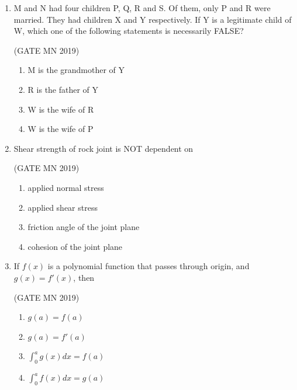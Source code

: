 \documentclass[journal]{IEEEtran}
\begin{document}
\begin{enumerate}
\hfill(GATE MN 2019)
\begin{multicols}{2}
\begin{enumerate}
\item 30
\item 35
\item 60
\item 72
\end{enumerate}
\end{multicols}


\item M and N had four children P, Q, R and S. Of them, only P and R were married. 
They had children X and Y respectively. If Y is a legitimate child of W, which one of the following statements is necessarily FALSE?


\hfill(GATE MN 2019)
\begin{multicols}{2}
\begin{enumerate}
\item M is the grandmother of Y
\item R is the father of Y
\item W is the wife of R
\item W is the wife of P
\end{enumerate}
\end{multicols}

\item Shear strength of rock joint is NOT dependent on

	\hfill(GATE MN 2019)
\begin{multicols}{2}
\begin{enumerate}
\item applied normal stress
\item applied shear stress
\item friction angle of the joint plane
\item cohesion of the joint plane
\end{enumerate}
\end{multicols}


\item If $f(x)$ is a polynomial function that passes through origin, and $g(x) = f'(x)$, then

	\hfill(GATE MN 2019)
\begin{multicols}{2}
\begin{enumerate}
\item $g(a) = f(a)$
\item $g(a) = f'(a)$
\item $\int_0^a g(x)dx = f(a)$
\item $\int_0^a f(x)dx = g(a)$
\end{enumerate}
\end{multicols}


\end{enumerate}
\end{document}
